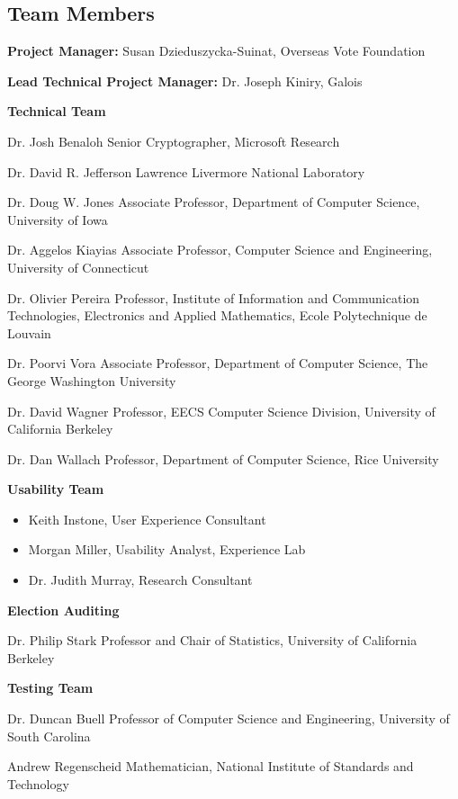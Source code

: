 \subsection{Team Members}
\label{sec:team-members}

\textbf{Project Manager:} Susan Dzieduszycka-Suinat, Overseas Vote Foundation

\textbf{Lead Technical Project Manager:} Dr. Joseph Kiniry, Galois

\textbf{Technical Team}

Dr. Josh Benaloh
Senior Cryptographer, Microsoft Research
 
Dr. David R. Jefferson
Lawrence Livermore National Laboratory
 
Dr. Doug W. Jones
Associate Professor, Department of Computer Science, University of Iowa
 
Dr. Aggelos Kiayias
Associate Professor, Computer Science and Engineering, University of Connecticut
 
Dr. Olivier Pereira
Professor, Institute of Information and Communication Technologies, Electronics and Applied Mathematics, Ecole Polytechnique de Louvain
 
Dr. Poorvi Vora
Associate Professor, Department of Computer Science, The George Washington University
 
Dr. David Wagner
Professor, EECS Computer Science Division, University of California Berkeley
 
Dr. Dan Wallach
Professor, Department of Computer Science, Rice University
 
\textbf{Usability Team}

\begin{itemize}
\item Keith Instone, User Experience Consultant
\item Morgan Miller, Usability Analyst, Experience Lab
\item Dr. Judith Murray, Research Consultant
\end{itemize}

\textbf{Election Auditing}

Dr. Philip Stark
Professor and Chair of Statistics, University of California Berkeley
 
\textbf{Testing Team}

Dr. Duncan Buell
Professor of Computer Science and Engineering, University of South Carolina
 
Andrew Regenscheid
Mathematician, National Institute of Standards and Technology
 
